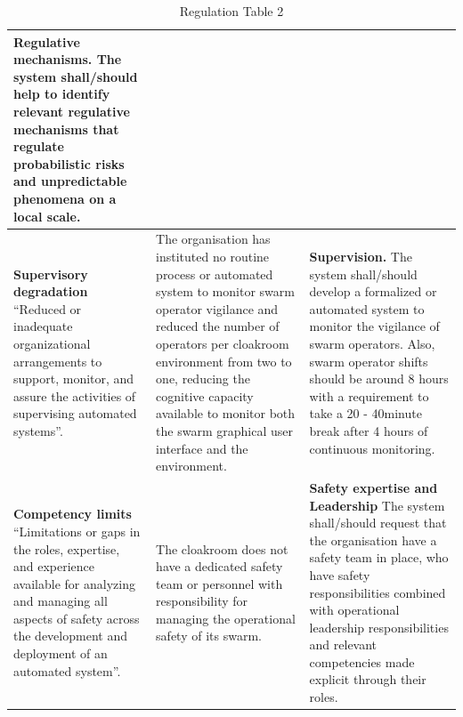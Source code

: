 \documentclass[lettersize,journal]{IEEEtran}
\begin{document}
\begin{landscape}
\begin{table}[]
\begin{tabular}{|p{0.3\textheight}|p{0.35\textheight}|p{0.35\textheight}|}
   \textbf{Regulative mechanisms.} The system shall/should help to identify relevant regulative mechanisms that regulate probabilistic risks and unpredictable phenomena on a local scale. \\
   \hline
   \textbf{Supervisory degradation} ``Reduced or inadequate organizational arrangements to support, monitor, and assure the activities of supervising automated systems”. \cite{macrae2021learning} & The organisation has instituted no routine process or automated system to monitor swarm operator vigilance and reduced the number of operators per cloakroom environment from two to one, reducing the cognitive capacity available to monitor both the swarm graphical user interface and the environment. &	\textbf{Supervision.} The system shall/should develop a formalized or automated system to monitor the vigilance of swarm operators. Also, swarm operator shifts should be around 8 hours with a requirement to take a 20 - 40minute break after 4 hours of continuous monitoring. \\
   \hline
   \textbf{Competency limits} ``Limitations or gaps in the roles, expertise, and experience available for analyzing and managing all aspects of safety across the development and deployment of an automated system”. \cite{macrae2021learning} & The cloakroom does not have a dedicated safety team or personnel with responsibility for managing the operational safety of its swarm. & \textbf{Safety expertise and Leadership} The system shall/should request that the organisation have a safety team in place, who have safety responsibilities combined with operational leadership responsibilities and relevant competencies made explicit through their roles.\\
   \hline
    \end{tabular}
    \caption{Regulation Table 2}
    \label{tab:reg_2}
\end{table}
\end{landscape}
\end{document}
